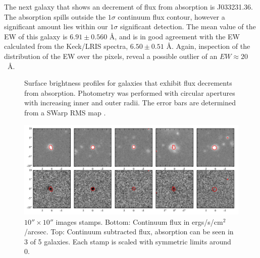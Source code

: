 \documentclass[twocolumn]{aastex6}
\begin{document}
The next galaxy that shows an decrement of flux from  absorption is J033231.36. The  absorption spills outside the $1\sigma$ continuum flux contour, however a significant amount lies within our $1\sigma$ significant detection. The mean value of the EW of this galaxy is $6.91 \pm 0.560$ \AA, and is in good agreement with the EW calculated from the Keck/LRIS spectra, $6.50 \pm 0.51$ \AA. Again, inspection of the distribution of the EW over the pixels, reveal a possible outlier of an $EW\approx 20$\ \AA.


\begin{figure}
\centering
{}
\caption{Surface brightness profiles for galaxies that exhibit flux decrements from  absorption. Photometry was performed with circular apertures with increasing inner and outer radii. The error bars are determined from a SWarp RMS map .}
\label{fig:sb_profiles}
\end{figure}

\begin{figure}[!htb]
\centering
\includegraphics[scale=0.7]{../Figures/stamps.pdf}
\caption{ $10'' \times 10''$ images stamps. Bottom: Continuum flux in ergs/s/cm$^2$/arcsec. Top: Continuum subtracted  flux, absorption can be seen in 3 of 5 galaxies. Each stamp is scaled with symmetric limits around 0.}
\label{fig:stamp_images}
\end{figure}
\end{document}
